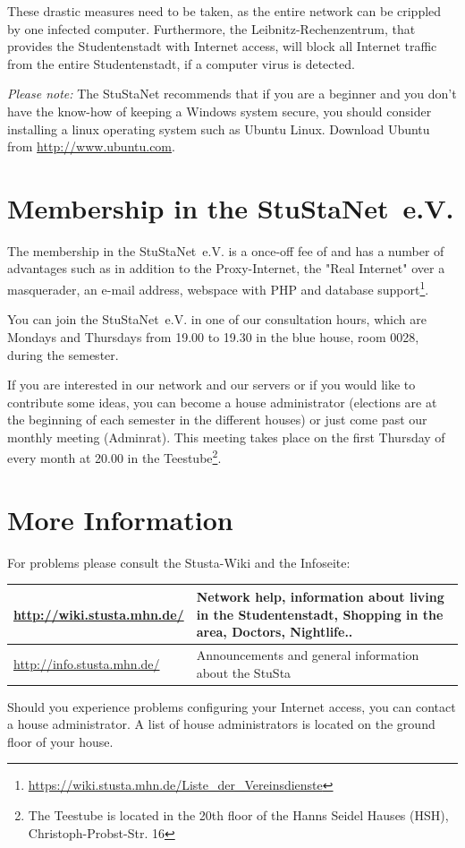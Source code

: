 \documentclass[a4paper,12pt]{scrartcl}
\begin{document}
These drastic measures need to be taken, as the entire network can be crippled by one infected computer. Furthermore, the Leibnitz-Rechenzentrum, that provides the Studentenstadt with Internet access, will block all Internet traffic from the entire Studentenstadt, if a computer virus is detected.

\emph{Please note:} The StuStaNet recommends that if you are a beginner and you don't have the know-how of keeping a Windows system secure, you should consider installing a linux operating system such as Ubuntu Linux. Download Ubuntu from \url{http://www.ubuntu.com}.


\section*{Membership in the StuStaNet~e.V.}

The membership in the StuStaNet~e.V. is a once-off fee of  and has a number of advantages such as in addition to the Proxy-Internet, the "Real Internet" over a masquerader, an e-mail address, webspace with PHP and database support\footnote{\url{https://wiki.stusta.mhn.de/Liste\_der\_Vereinsdienste}}.

You can join the StuStaNet~e.V. in one of our consultation hours, which are Mondays and Thursdays from 19.00 to 19.30 in the blue house, room 0028, during the semester.

If you are interested in our network and our servers or if you would like to contribute some ideas, you can become a house administrator (elections are at the beginning of each semester in the different houses) or just come past our monthly meeting (Adminrat). This meeting takes place on the first Thursday of every month at 20.00 in the Teestube\footnote{The Teestube is located in the 20th floor of the Hanns Seidel Hauses (HSH), Christoph-Probst-Str. 16}.

\section*{More Information}

For problems please consult the Stusta-Wiki and the Infoseite:

\begin{center}
  \begin{tabularx}{\linewidth}{|lX|}
    \hline
    \url{http://wiki.stusta.mhn.de/} & Network help, information about living in the Studentenstadt, Shopping in the area, Doctors, Nightlife..\\
    \hline
    \url{http://info.stusta.mhn.de/} & Announcements and general information about the StuSta\\
    \hline
  \end{tabularx}
\end{center}
Should you experience problems configuring your Internet access, you can contact a house administrator. A list of house administrators is located on the ground floor of your house.
\end{document}
